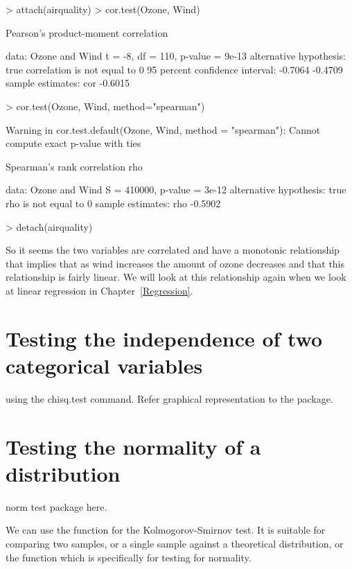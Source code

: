\begin{Schunk}
\begin{Sinput}
> attach(airquality) 
> cor.test(Ozone, Wind) 
\end{Sinput}
\begin{Soutput}

	Pearson's product-moment correlation

data:  Ozone and Wind
t = -8, df = 110, p-value = 9e-13
alternative hypothesis: true correlation is not equal to 0
95 percent confidence interval:
 -0.7064 -0.4709
sample estimates:
    cor 
-0.6015 
\end{Soutput}
\begin{Sinput}
> cor.test(Ozone, Wind, method="spearman") 
\end{Sinput}
\begin{Soutput}
Warning in cor.test.default(Ozone, Wind, method = "spearman"): Cannot compute exact p-value with ties
\end{Soutput}
\begin{Soutput}

	Spearman's rank correlation rho

data:  Ozone and Wind
S = 410000, p-value = 3e-12
alternative hypothesis: true rho is not equal to 0
sample estimates:
    rho 
-0.5902 
\end{Soutput}
\begin{Sinput}
> detach(airquality) 
\end{Sinput}
\end{Schunk}

So it seems the two variables are correlated and have a monotonic relationship that implies that as wind increases the amount of ozone decreases and that this relationship is fairly linear. We will look at this relationship again when we look at linear regression in Chapter~\ref{Regression}. 
 
 
 
 
 
\section{Testing the independence of two categorical variables} 
using the chisq.test command. 
Refer graphical representation to the  package. 
 
\section{Testing the normality of a distribution} 
\label{NormalityTests}

 
norm test package here. 
 
We can use the  function for the Kolmogorov-Smirnov test. It is suitable for comparing two samples, or a single sample against a theoretical distribution, or the  function which is specifically for testing for normality. 
 



